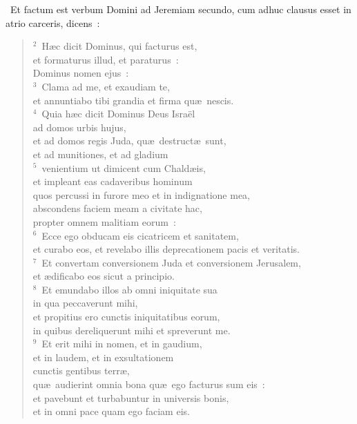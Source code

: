 ~\lettrine[lines=10,image=true,loversize=0.05,lraise=-0.03]{E}{}t factum est verbum Domini ad Jeremiam secundo, cum adhuc clausus esset in atrio carceris, dicens~:
\begin{flushleft}\begin{verse}\vspace{6pt}${}^{2}$~H\ae c dicit Dominus, qui facturus est,\\ et formaturus illud, et paraturus~:\\ Dominus nomen ejus~:\\
${}^{3}$~Clama ad me, et exaudiam te,\\ et annuntiabo tibi grandia et firma qu\ae\ nescis.\\
${}^{4}$~Quia h\ae c dicit Dominus Deus Isra\"el\\ ad domos urbis hujus,\\ et ad domos regis Juda, qu\ae\ destruct\ae\ sunt,\\ et ad munitiones, et ad gladium\\
${}^{5}$~venientium ut dimicent cum Chald\ae is,\\ et impleant eas cadaveribus hominum\\ quos percussi in furore meo et in indignatione mea,\\ abscondens faciem meam a civitate hac,\\ propter omnem malitiam eorum~:\\
${}^{6}$~Ecce ego obducam eis cicatricem et sanitatem,\\ et curabo eos, et revelabo illis deprecationem pacis et veritatis.\\
${}^{7}$~Et convertam conversionem Juda et conversionem Jerusalem,\\ et \ae dificabo eos sicut a principio.\\
${}^{8}$~Et emundabo illos ab omni iniquitate sua\\ in qua peccaverunt mihi,\\ et propitius ero cunctis iniquitatibus eorum,\\ in quibus dereliquerunt mihi et spreverunt me.\\
${}^{9}$~Et erit mihi in nomen, et in gaudium,\\ et in laudem, et in exsultationem\\ cunctis gentibus terr\ae ,\\ qu\ae\ audierint omnia bona qu\ae\ ego facturus sum eis~:\\ et pavebunt et turbabuntur in universis bonis,\\ et in omni pace quam ego faciam eis.\\

\end{verse}
\end{flushleft}
